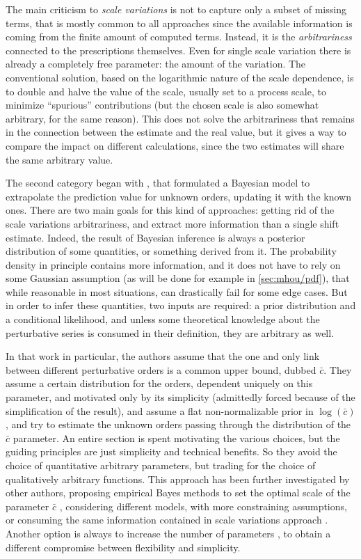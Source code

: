The main criticism to \textit{scale variations} is not to capture only a subset
of missing terms, that is mostly common to all approaches since the available
information is coming from the finite amount of computed terms.
Instead, it is the \textit{arbitrariness} connected to the prescriptions
themselves.
%
Even for single scale variation there is already a completely free parameter:
the amount of the variation.
%
The conventional solution, based on the logarithmic nature of the scale
dependence, is to double and halve the value of the scale, usually set to a
process scale, to minimize \enquote{spurious} contributions (but the chosen
scale is also somewhat arbitrary, for the same reason).
%
This does not solve the arbitrariness that remains in the connection between
the estimate and the real value, but it gives a way to compare the impact on
different calculations, since the two estimates will share the same arbitrary
value.

The second category began with \cite{Cacciari:2011ze}, that formulated a
Bayesian model to extrapolate the prediction value for unknown orders, updating
it with the known ones.
%
There are two main goals for this kind of approaches: getting rid of the
scale variations arbitrariness, and extract more information than a single
shift estimate.
Indeed, the result of Bayesian inference is always a posterior distribution of
some quantities, or something derived from it.
%
The probability density in principle contains more information, and it does not
have to rely on some Gaussian assumption (as will be done for example in
\cref{sec:mhou/pdf}), that while reasonable in most situations, can drastically
fail for some edge cases.
%
But in order to infer these quantities, two inputs are required: a prior
distribution and a conditional likelihood, and unless some theoretical
knowledge about the perturbative series is consumed in their definition, they
are arbitrary as well.

In that work in particular, the authors assume that the one and only link
between different perturbative orders is a common upper bound, dubbed
$\bar{c}$.
They assume a certain distribution for the orders, dependent uniquely on this
parameter, and motivated only by its simplicity (admittedly forced because of
the simplification of the result), and assume a flat non-normalizable prior in
$\log(\bar{c})$, and try to estimate the unknown orders passing through the
distribution of the $\bar{c}$ parameter.
%
An entire section is spent motivating the various choices, but the guiding
principles are just simplicity and technical benefits.
So they avoid the choice of quantitative arbitrary parameters, but trading for
the choice of qualitatively arbitrary functions.
%
This approach has been further investigated by other authors, proposing
empirical Bayes methods to set the optimal scale of the parameter $\bar{c}$
\cite{Forte:2013mda}, considering different models, with more constraining
assumptions, or consuming the same information contained in scale variations
approach \cite{Bonvini:2020xeo}.
Another option is always to increase the number of parameters
\cite{Duhr:2021mfd}, to obtain a different compromise between flexibility and
simplicity.

